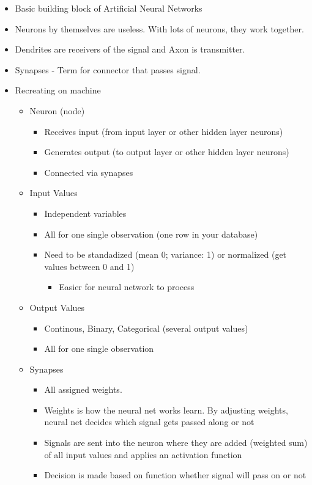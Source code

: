 \documentclass[11pt]{article}
\begin{document}
\begin{itemize}
\item Basic building block of Artificial Neural Networks
\item Neurons by themselves are useless. With lots of neurons, they work together.
\item Dendrites are receivers of the signal and Axon is transmitter.
\item Synapses - Term for connector that passes signal.

\item Recreating on machine
\begin{itemize}
\item Neuron (node)
\begin{itemize}
\item Receives input (from input layer or other hidden layer neurons)
\item Generates output (to output layer or other hidden layer neurons)
\item Connected via synapses
\end{itemize}
\item Input Values
\begin{itemize}
\item Independent variables
\item All for one single observation (one row in your database)
\item Need to be standadized (mean 0; variance: 1) or normalized (get values between 0 and 1)
\begin{itemize}
\item Easier for neural network to process
\end{itemize}
\end{itemize}
\item Output Values
\begin{itemize}
\item Continous, Binary, Categorical (several output values)
\item All for one single observation
\end{itemize}
\item Synapses
\begin{itemize}
\item All assigned weights.
\item Weights is how the neural net works learn. By adjusting weights, neural net decides which signal gets passed along or not
\item Signals are sent into the neuron where they are added (weighted sum) of all input values and applies an activation function
\item Decision is made based on function whether signal will pass on or not
\end{itemize}
\end{itemize}
\end{itemize}
\end{document}
